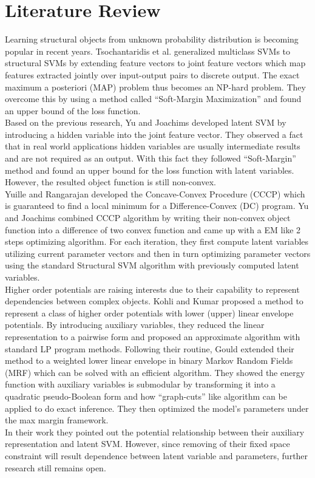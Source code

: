 \documentclass{article}
\begin{document}
	\section{Literature Review}
	Learning structural objects from unknown probability distribution is becoming popular in recent years. Tsochantaridis et al.\cite{tsochantaridis2005large} generalized multiclass SVMs\cite{crammer2002algorithmic} to structural SVMs by extending feature vectors to joint feature vectors which map features extracted jointly over input-output pairs to discrete output. The exact maximum a posteriori (MAP) problem thus becomes an NP-hard problem. They overcome this by using a method called “Soft-Margin Maximization” and found an upper bound of the loss function.\\
	Based on the previous research, Yu and Joachims\cite{yu2009learning} developed latent SVM by introducing a hidden variable into the joint feature vector. They observed a fact that in real world applications hidden variables are usually intermediate results and are not required as an output. With this fact they followed “Soft-Margin” method and found an upper bound for the loss function with latent variables. However, the resulted object function is still non-convex.\\
	Yuille and Rangarajan \cite{yuille2002concave} developed the Concave-Convex Procedure (CCCP) which is guaranteed to find a local minimum for a Difference-Convex (DC) program. Yu and Joachims\cite{yu2009learning} combined CCCP algorithm by writing their non-convex object function into a difference of two convex function and came up with a EM like 2 steps optimizing algorithm. For each iteration, they first compute latent variables utilizing current parameter vectors and then in turn optimizing parameter vectors using the standard Structural SVM algorithm with previously computed latent variables. \\
	Higher order potentials are raising interests due to their capability to represent dependencies between complex objects. Kohli and Kumar\cite{kohli2009robust} proposed a method to represent a class of higher order potentials with lower (upper) linear envelope potentials. By introducing auxiliary variables, they reduced the linear representation to a pairwise form and proposed an approximate algorithm with standard LP program methods. Following their routine, Gould\cite{gouldlearning} extended their method to a weighted lower linear envelope in binary Markov Random Fields (MRF) which can be solved with an efficient algorithm. They showed the energy function with auxiliary variables is submodular by transforming it into a quadratic pseudo-Boolean form and how “graph-cuts” like algorithm can be applied to do exact inference. They then optimized the model’s parameters under the max margin framework\cite{tsochantaridis2005large}. \\
	In their work they pointed out the potential relationship between their auxiliary representation and latent SVM\cite{yu2009learning}. However, since removing of their fixed space constraint will result dependence between latent variable and parameters, further research still remains open.
	
\end{document}
